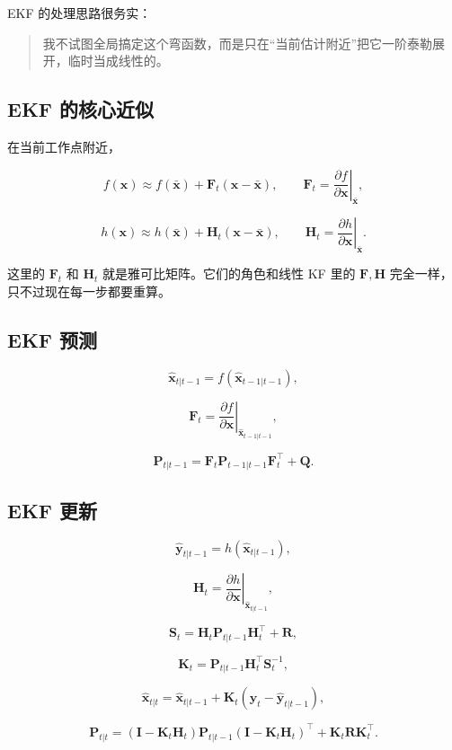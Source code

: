 \documentclass[12pt,a4paper]{ctexart}
\begin{document}
EKF 的处理思路很务实：

\begin{quote}
我不试图全局搞定这个弯函数，而是只在“当前估计附近”把它一阶泰勒展开，临时当成线性的。
\end{quote}

\subsection{EKF 的核心近似}

在当前工作点附近，

\[
f(\bm{x}) \approx f(\bar{\bm{x}}) + \bm{F}_t(\bm{x} - \bar{\bm{x}}),
\qquad
\bm{F}_t = \left.\frac{\partial f}{\partial \bm{x}}\right|_{\bar{\bm{x}}},
\]

\[
h(\bm{x}) \approx h(\bar{\bm{x}}) + \bm{H}_t(\bm{x} - \bar{\bm{x}}),
\qquad
\bm{H}_t = \left.\frac{\partial h}{\partial \bm{x}}\right|_{\bar{\bm{x}}}.
\]

这里的 \(\bm{F}_t\) 和 \(\bm{H}_t\) 就是雅可比矩阵。它们的角色和线性 KF 里的 \(\bm{F}, \bm{H}\) 完全一样，只不过现在每一步都要重算。

\subsection{EKF 预测}

\[
\hat{\bm{x}}_{t|t-1} = f(\hat{\bm{x}}_{t-1|t-1}),
\]

\[
\bm{F}_t = \left.\frac{\partial f}{\partial \bm{x}}\right|_{\hat{\bm{x}}_{t-1|t-1}},
\]

\[
\bm{P}_{t|t-1} = \bm{F}_t\bm{P}_{t-1|t-1}\bm{F}_t^\top + \bm{Q}.
\]

\subsection{EKF 更新}

\[
\hat{\bm{y}}_{t|t-1} = h(\hat{\bm{x}}_{t|t-1}),
\]

\[
\bm{H}_t = \left.\frac{\partial h}{\partial \bm{x}}\right|_{\hat{\bm{x}}_{t|t-1}},
\]

\[
\bm{S}_t = \bm{H}_t\bm{P}_{t|t-1}\bm{H}_t^\top + \bm{R},
\]

\[
\bm{K}_t = \bm{P}_{t|t-1}\bm{H}_t^\top \bm{S}_t^{-1},
\]

\[
\hat{\bm{x}}_{t|t} = \hat{\bm{x}}_{t|t-1} + \bm{K}_t\left(\bm{y}_t - \hat{\bm{y}}_{t|t-1}\right),
\]

\[
\bm{P}_{t|t}
= (\bm{I} - \bm{K}_t\bm{H}_t)\bm{P}_{t|t-1}(\bm{I} - \bm{K}_t\bm{H}_t)^\top
+ \bm{K}_t\bm{R}\bm{K}_t^\top.
\]
\end{document}
